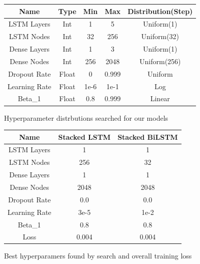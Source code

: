 \documentclass[final]{cvpr}
\begin{document}
    \begin{figure}[h]
        \caption{Hyperparameter distrbutions searched for our models}
        \center
        \begin{tabular}{| c || c | c | c | c |}
            \hline 
            Name & Type & Min & Max & Distribution(Step) \\ 
            \hline
            \hline
            LSTM Layers   & Int   & 1   & 5    & Uniform(1)\\
            LSTM Nodes    & Int   & 32  & 256  & Uniform(32) \\
            Dense Layers  & Int   & 1   & 3    & Uniform(1)\\
            Dense Nodes   & Int   & 256 & 2048 & Uniform(256)\\
            Dropout Rate  & Float & 0   & 0.999& Uniform\\
            Learning Rate & Float & 1e-6& 1e-1 & Log\\
            Beta\_1       & Float & 0.8 & 0.999& Linear\\
            \hline
        \end{tabular}
        \label{fig:hyperparameters}
    \end{figure}

    \begin{figure}[h]
        \caption{Best hyperparamers found by search and overall training loss}
        \center
        \begin{tabular}{| c || c | c |}
            \hline 
            Name & Stacked LSTM & Stacked BiLSTM\\ 
            \hline
            \hline
            LSTM Layers   & 1 & 1\\
            LSTM Nodes    & 256 & 32\\
            Dense Layers  & 1 & 1\\
            Dense Nodes   & 2048 & 2048\\
            Dropout Rate  & 0.0 & 0.0\\
            Learning Rate & 3e-5 & 1e-2\\
            Beta\_1       & 0.8 & 0.8\\
            \hline
            \hline
            Loss          & 0.004 & 0.004\\
            \hline
        \end{tabular}
        \label{fig:optimal_hyperparameters}
    \end{figure}
\end{document}
